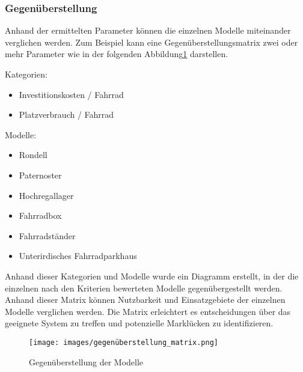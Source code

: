 \subsubsection{Gegenüberstellung}

Anhand der ermittelten Parameter können die einzelnen Modelle miteinander verglichen werden. Zum Beispiel kann eine Gegenüberstellungsmatrix zwei oder mehr Parameter wie in der folgenden Abbildung\ref{fig:gegenueberstellung} darstellen.

Kategorien:
\begin{itemize}
  \item Investitionskosten / Fahrrad
  \item Platzverbrauch / Fahrrad
\end{itemize}

Modelle:
\begin{itemize}
  \item Rondell
  \item Paternoster
  \item Hochregallager
  \item Fahrradbox
  \item Fahrradständer
  \item Unterirdisches Fahrradparkhaus
\end{itemize}

Anhand dieser Kategorien und Modelle wurde ein Diagramm erstellt, in der die einzelnen nach den Kriterien bewerteten Modelle gegenübergestellt werden. Anhand dieser Matrix können Nutzbarkeit und Einsatzgebiete der einzelnen Modelle verglichen werden. Die Matrix erleichtert es entscheidungen über das geeignete System zu treffen und potenzielle Marklücken zu identifizieren.

\begin{figure}[h]
  \centering
  \texttt{[image: images/gegenüberstellung\_matrix.png]}
  \caption{Gegenüberstellung der Modelle}
  \label{fig:gegenueberstellung}
\end{figure}